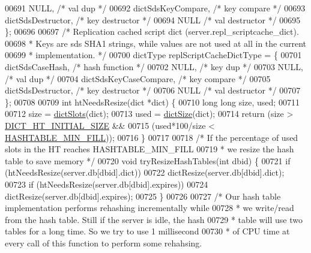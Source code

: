 \begin{DoxyCode}
{{{{{00691     NULL,                       \textcolor{comment}{/* val dup */}
00692     dictSdsKeyCompare,          \textcolor{comment}{/* key compare */}
00693     dictSdsDestructor,          \textcolor{comment}{/* key destructor */}
00694     NULL                        \textcolor{comment}{/* val destructor */}
00695 \};
00696 
00697 \textcolor{comment}{/* Replication cached script dict (server.repl\_scriptcache\_dict).}
00698 \textcolor{comment}{ * Keys are sds SHA1 strings, while values are not used at all in the current}
00699 \textcolor{comment}{ * implementation. */}
00700 dictType replScriptCacheDictType = \{
00701     dictSdsCaseHash,            \textcolor{comment}{/* hash function */}
00702     NULL,                       \textcolor{comment}{/* key dup */}
00703     NULL,                       \textcolor{comment}{/* val dup */}
00704     dictSdsKeyCaseCompare,      \textcolor{comment}{/* key compare */}
00705     dictSdsDestructor,          \textcolor{comment}{/* key destructor */}
00706     NULL                        \textcolor{comment}{/* val destructor */}
00707 \};
00708 
00709 \textcolor{keywordtype}{int} htNeedsResize(dict *dict) \{
00710     \textcolor{keywordtype}{long} \textcolor{keywordtype}{long} size, used;
00711 
00712     size = \hyperlink{dict_8h_aca9596be4bcc2caa07c17dd8cebcceec}{dictSlots}(dict);
00713     used = \hyperlink{dict_8h_af193430dd3d5579a52b194512f72c1f0}{dictSize}(dict);
00714     \textcolor{keywordflow}{return} (size > \hyperlink{dict_8h_aff97c19d1616cf2c697573ee3f515692}{DICT\_HT\_INITIAL\_SIZE} &&
00715             (used*100/size < \hyperlink{server_8h_aab8d0fb9427699c23cdbeb524f875562}{HASHTABLE\_MIN\_FILL}));
00716 \}
00717 
00718 \textcolor{comment}{/* If the percentage of used slots in the HT reaches HASHTABLE\_MIN\_FILL}
00719 \textcolor{comment}{ * we resize the hash table to save memory */}
00720 \textcolor{keywordtype}{void} tryResizeHashTables(\textcolor{keywordtype}{int} dbid) \{
00721     \textcolor{keywordflow}{if} (htNeedsResize(server.db[dbid].dict))
00722         dictResize(server.db[dbid].dict);
00723     \textcolor{keywordflow}{if} (htNeedsResize(server.db[dbid].expires))
00724         dictResize(server.db[dbid].expires);
00725 \}
00726 
00727 \textcolor{comment}{/* Our hash table implementation performs rehashing incrementally while}
00728 \textcolor{comment}{ * we write/read from the hash table. Still if the server is idle, the hash}
00729 \textcolor{comment}{ * table will use two tables for a long time. So we try to use 1 millisecond}
00730 \textcolor{comment}{ * of CPU time at every call of this function to perform some rehahsing.}
}}}}}
\end{DoxyCode}
